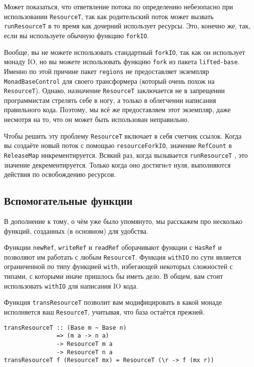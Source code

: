 {Может показаться, что ответвление потока по определению небезопасно при использовании 
\lstinline'ResourceT', так как родительский поток может вызвать
\lstinline'runResourceT' в то время
как дочерний использует ресурсы. Это, конечно же, так, если вы используете обычную
функцию \lstinline'forkIO'.

\begin{remark}
Вообще, вы не можете использовать стандартный \lstinline'forkIO', так как он
использует монаду
IO, но вы можете использовать функцию \lstinline'fork' из пакета \lstinline{lifted-base}.
Именно по этой причине пакет \lstinline{regions} не предоставляет экземпляр \lstinline'MonadBaseControl' для своего
трансформера (который очень похож на \lstinline'ResourceT'). Однако, назначение
\lstinline'ResourceT' заключается не в запрещении 
программистам стрелять себе в ногу, а только в облегчении написания
правильного кода. Поэтому, мы всё же предоставляем этот экземпляр, даже несмотря на то, что он может быть
использован неправильно. 
\end{remark}

Чтобы решить эту проблему \lstinline'ResourceT' включает в себя
счетчик ссылок. Когда вы создаёте новый поток с помощью \lstinline'resourceForkIO',
значение \lstinline'RefCount' в \lstinline'ReleaseMap' инкрементируется. Всякий раз, когда вызывается 
\lstinline'runResourceT'
, это значение декрементируется. Только когда оно достигнeт нуля, выполняются
действия по освобождению ресурсов.
 
\subsection{Вспомогательные функции}

В дополнение к тому, о чём уже было упомянуто, мы расскажем про несколько функций, созданных (в основном) для удобства.
   
Функции \verb=newRef=, \verb=writeRef= и \verb=readRef= оборачивают
функции с \lstinline'HasRef' и позволяют им работать с любым \lstinline'ResourceT'.
Функция \verb=withIO= по сути является ограниченной по типу функцией \verb=with=, избегающей некоторых сложностей с типами, с которыми иначе пришлось бы иметь дело.
В общем, вам стоит использовать \lstinline'withIO' для написания IO кода.

Функция \verb=transResourceT= позволит вам модифицировать в какой монаде исполняется ваш
\verb=ResourceT=, учитывая, что база остаётся прежней.
\begin{lstlisting}
transResourceT :: (Base m ~ Base n)
               => (m a -> n a)
               -> ResourceT m a
               -> ResourceT n a
transResourceT f (ResourceT mx) = ResourceT (\r -> f (mx r))
\end{lstlisting}  

}
